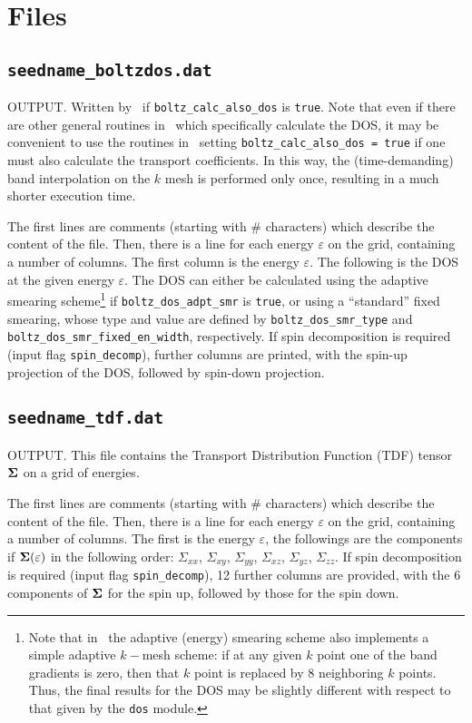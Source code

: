 \section{Files}
\subsection{{\tt seedname\_boltzdos.dat}}
OUTPUT. Written by \postw\ if {\tt boltz\_calc\_also\_dos} is \verb#true#. Note that even if there are other general routines in \postw\ which specifically calculate the DOS, it may be convenient to use the routines in \bw\ setting {\tt boltz\_calc\_also\_dos = true} if one must also calculate the transport coefficients. In this way, the (time-demanding) band interpolation on the $k$ mesh is performed only once, resulting in a much shorter execution time.

The first lines are comments (starting with \# characters) which describe the content of the file.
Then, there is a line for each energy $\varepsilon$ on the grid, containing a number of columns. The first column is the energy $\varepsilon$. The following is the DOS at the given energy $\varepsilon$.
The DOS can either be calculated using the adaptive smearing scheme\footnote{%
Note that in \bw\ the adaptive (energy) smearing scheme also implements a simple adaptive $k-$mesh scheme:
if at any given $k$ point one of the band gradients is zero, then that $k$ point is replaced by 8 neighboring $k$ points. Thus, the final results for the DOS may be slightly different with respect to that given by the {\tt dos} module.} if {\tt boltz\_dos\_adpt\_smr} is \verb#true#, or using a ``standard'' fixed smearing, whose type and value are defined by {\tt boltz\_dos\_smr\_type} and {\tt boltz\_dos\_smr\_fixed\_en\_width}, respectively.
If spin decomposition is required (input flag {\tt spin\_decomp}), further columns are printed, with the spin-up projection of the DOS, followed by spin-down projection.

\subsection{{\tt seedname\_tdf.dat}}
OUTPUT. This file contains the Transport Distribution Function (TDF) tensor $\bm{\mathrm{\Sigma}}$ on a grid of energies.

The first lines are comments (starting with \# characters) which describe the content of the file.
Then, there is a line for each energy $\varepsilon$ on the grid, containing a number of columns. The first is the energy $\varepsilon$, the followings are the components if $\bm{\mathrm{\Sigma}}(\varepsilon)$ in the following order: $\Sigma_{xx}$, $\Sigma_{xy}$, $\Sigma_{yy}$, $\Sigma_{xz}$, $\Sigma_{yz}$, $\Sigma_{zz}$. If spin decomposition is required (input flag {\tt spin\_decomp}), 12 further columns are provided, with the 6 components of $\bm{\mathrm{\Sigma}}$ for the spin up, followed by those for the spin down.


